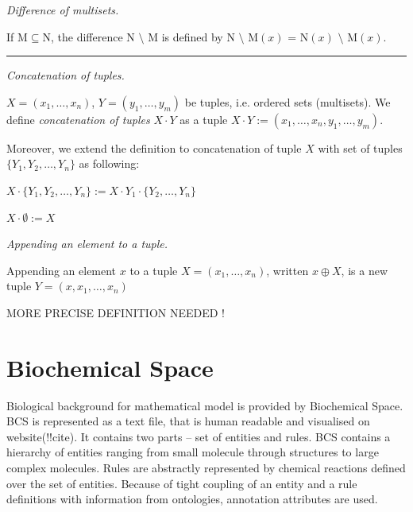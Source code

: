 \documentclass{elsarticle}
\begin{document}
\begin{definition}
\emph{Difference of multisets.}

\noindent If $\mathrm{M} \subseteq \mathrm{N}$, the difference $\mathrm{N}$ $\setminus$ $\mathrm{M}$ is defined by $\mathrm{N}$ $\setminus$ $\mathrm{M}(x)$ = $\mathrm{N}(x)$ $\setminus$ $\mathrm{M}(x)$.
\end{definition}

\noindent\rule{\textwidth}{1pt}

\begin{definition}
\emph{Concatenation of tuples.}

\noindent $X = (x_1, \ldots, x_n)$, $Y = (y_1, \ldots, y_m)$ be tuples, i.e. ordered sets (multisets). We define \emph{concatenation of tuples} $X \cdot Y$ as a tuple $X \cdot Y := (x_1, \ldots, x_n, y_1, \ldots, y_m)$.

Moreover, we extend the definition to concatenation of tuple $X$ with set of tuples $\{ Y_1, Y_2, \ldots, Y_n \}$ as following:

\begin{center}
$X \cdot \{ Y_1, Y_2, \ldots, Y_n \} := X \cdot Y_1 \cdot \{ Y_2, \ldots, Y_n \}$

$ X \cdot \emptyset := X $
\end{center}

\end{definition}

\begin{definition}
\emph{Appending an element to a tuple.}

Appending an element $x$ to a tuple $X = (x_1, \ldots, x_n)$, written $x \oplus X$, is a new tuple $Y = (x, x_1, \ldots, x_n)$

MORE PRECISE DEFINITION NEEDED !
\end{definition}


\section{Biochemical Space}

Biological background for mathematical model is provided by Biochemical Space. BCS is represented as a text file, that is human readable and visualised on website(!!cite). It contains two parts – set of entities and rules. BCS contains a hierarchy of entities ranging from small molecule through structures to large complex molecules. Rules are abstractly represented by chemical reactions defined over the set of entities. Because of tight coupling of an entity and a rule definitions with information from ontologies, annotation attributes are used.
\end{document}
